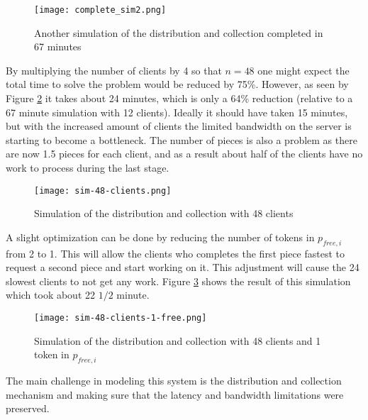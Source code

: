 \begin{figure}[htbp]
	\centering 
	\texttt{[image: complete\_sim2.png]}
	\caption{Another simulation of the distribution and collection completed in 67 minutes}
	\label{fig:complete_sim2}
\end{figure}

By multiplying the number of clients by 4 so that $n = 48$ one might expect the total time to solve the problem would be reduced by 75\%.
However, as seen by Figure \ref{fig:sim-48clients} it takes about 24 minutes, which is only a 64\% reduction (relative to a 67 minute simulation with 12 clients).
Ideally it should have taken 15 minutes, but with the increased amount of clients the limited bandwidth on the server is starting to become a bottleneck.
The number of pieces is also a problem as there are now 1.5 pieces for each client, and as a result about half of the clients have no work to process during the last stage.

\begin{figure}[tbp]
	\centering 
	\texttt{[image: sim-48-clients.png]}
	\caption{Simulation of the distribution and collection with 48 clients}
	\label{fig:sim-48clients}
\end{figure}

A slight optimization can be done by reducing the number of tokens in $p_{free,i}$ from 2 to 1.
This will allow the clients who completes the first piece fastest to request a second piece and start working on it.
This adjustment will cause the 24 slowest clients to not get any work.
Figure \ref{fig:sim-48clients-1free} shows the result of this simulation which took about 22 $1/2$ minute.

\begin{figure}[tbp]
	\centering 
	\texttt{[image: sim-48-clients-1-free.png]}
	\caption{Simulation of the distribution and collection with 48 clients and 1 token in $p_{free,i}$}
	\label{fig:sim-48clients-1free}
\end{figure}


The main challenge in modeling this system is the distribution and collection mechanism and making sure that the latency and bandwidth limitations were preserved.






